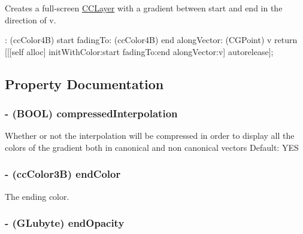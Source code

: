 Creates a full-\/screen \hyperlink{class_c_c_layer}{C\-C\-Layer} with a gradient between start and end in the direction of v. 
\begin{DoxyCode}
                     : (ccColor4B) start fadingTo: (ccColor4B) end alongVector:
       (CGPoint) v
{
    return [[[self alloc] initWithColor:start fadingTo:end alongVector:v] 
      autorelease];
}
\end{DoxyCode}


\subsection{Property Documentation}
\hypertarget{interface_c_c_layer_gradient_ad8cd6a119a30dc4a214a04a090f3e837}{
\subsubsection[{compressed\-Interpolation}]{\setlength{\rightskip}{0pt plus 5cm}-\/ (B\-O\-O\-L) {\bf compressed\-Interpolation}}}\label{interface_c_c_layer_gradient_ad8cd6a119a30dc4a214a04a090f3e837}
Whether or not the interpolation will be compressed in order to display all the colors of the gradient both in canonical and non canonical vectors Default\-: Y\-E\-S \hypertarget{interface_c_c_layer_gradient_ab7b61460bac5bc3d26e75ef614490b41}{
\subsubsection[{end\-Color}]{\setlength{\rightskip}{0pt plus 5cm}-\/ ({\bf cc\-Color3\-B}) {\bf end\-Color}}}\label{interface_c_c_layer_gradient_ab7b61460bac5bc3d26e75ef614490b41}
The ending color. \hypertarget{interface_c_c_layer_gradient_a4dd1259e4cb9649f93aa91c9e54e7a36}{
\subsubsection[{end\-Opacity}]{\setlength{\rightskip}{0pt plus 5cm}-\/ (G\-Lubyte) {\bf end\-Opacity}}}\label{interface_c_c_layer_gradient_a4dd1259e4cb9649f93aa91c9e54e7a36}
